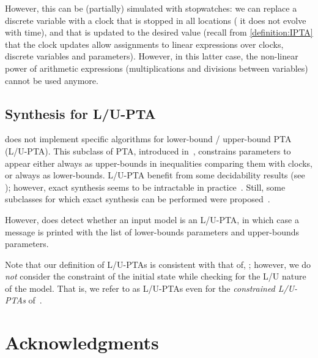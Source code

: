 However, this can be (partially) simulated with stopwatches: we can replace a discrete variable with a clock that is stopped in all locations (\ie{} it does not evolve with time), and that is updated to the desired value (recall from \cref{definition:IPTA} that the clock updates allow assignments to linear expressions over clocks, discrete variables and parameters).
However, in this latter case, the non-linear power of arithmetic expressions (multiplications and divisions between variables) cannot be used anymore.



\section{Synthesis for L/U-PTA}

\imitator{} does not implement specific algorithms for lower-bound / upper-bound PTA (L/U-PTA).
This subclass of PTA, introduced in~\cite{HRSV02}, constrains parameters to appear either always as upper-bounds in inequalities comparing them with clocks, or always as lower-bounds.
L/U-PTA benefit from some decidability results (see \eg{} \cite{HRSV02,BlT09,JLR15,ALime17,ALM20}); however, exact synthesis seems to be intractable in practice~\cite{JLR15,ALR16ICFEM}.
Still, some subclasses for which exact synthesis can be performed were proposed~\cite{BlT09,ALR18FORMATS}.

However, \imitator{} does detect whether an input model is an L/U-PTA, in which case a message is printed with the list of lower-bounds parameters and upper-bounds parameters.

\begin{remark}
	Note that our definition of L/U-PTAs is consistent with that of, \eg{} \cite{BlT09}; however, we do \emph{not} consider the constraint of the initial state while checking for the L/U nature of the model.
	That is, we refer to as L/U-PTAs even for the \emph{constrained L/U-PTAs} of~\cite{BlT09}.
\end{remark}




\chapter{Acknowledgments}


